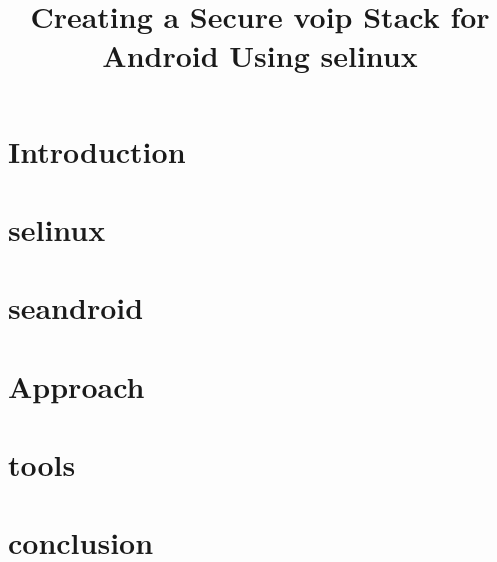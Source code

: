 \documentclass[12pt,conference]{IEEEtran}
\title{Creating a Secure \acs{voip} Stack for Android Using \acs{selinux}}
\author{\IEEEauthorblockN{Fotios Lindiakos}
  \IEEEauthorblockA{flindiak@gmu.edu}
  \and
  \IEEEauthorblockN{Burns Mijanovich}
  \IEEEauthorblockA{bmijanov@gmu.edu}
}
\begin{document}
\maketitle

\section{Introduction}


\section{\acs{selinux}}


\section{\acs{seandroid}}


\section{Approach}


\section{tools}


\section{conclusion}

\end{document}
